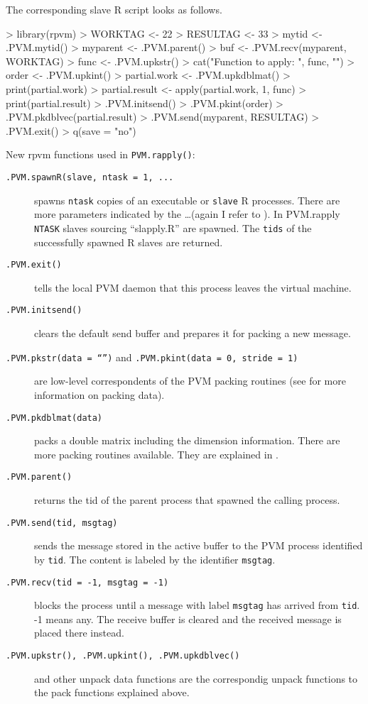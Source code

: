 The corresponding slave R script looks as follows.

\begin{Schunk}
\begin{Sinput}
> library(rpvm)
> WORKTAG <- 22
> RESULTAG <- 33
> mytid <- .PVM.mytid()
> myparent <- .PVM.parent()
> buf <- .PVM.recv(myparent, WORKTAG)
> func <- .PVM.upkstr()
> cat("Function to apply: ", func, "\n")
> order <- .PVM.upkint()
> partial.work <- .PVM.upkdblmat()
> print(partial.work)
> partial.result <- apply(partial.work, 1, func)
> print(partial.result)
> .PVM.initsend()
> .PVM.pkint(order)
> .PVM.pkdblvec(partial.result)
> .PVM.send(myparent, RESULTAG)
> .PVM.exit()
> q(save = "no")
\end{Sinput}
\end{Schunk}


New rpvm functions used in \texttt{PVM.rapply()}:

\begin{description}
\item[\texttt{.PVM.spawnR(slave, ntask = 1, ...}] spawns \texttt{ntask} copies
  of an executable or \texttt{slave} R processes. There are more
  parameters indicated by the \ldots (again I refer to \cite{nali07rpvm}). In
  PVM.rapply \texttt{NTASK} slaves sourcing ``slapply.R'' are
  spawned. The \texttt{tids} of the successfully spawned R slaves are
  returned.
\item[\texttt{.PVM.exit()}] tells the local PVM daemon that this process leaves
  the virtual machine.
\item[\texttt{.PVM.initsend()}] clears the default send buffer and
  prepares it for packing a new message.
\item[\texttt{.PVM.pkstr(data = ``'')} and \texttt{.PVM.pkint(data =
    0, stride = 1)}] are low-level correspondents of the PVM packing
    routines (see \cite{geist94pvm} for more information on packing
    data). 
\item[\texttt{.PVM.pkdblmat(data)}] packs a double matrix including
  the dimension information. There are more packing routines
  available. They are explained in \cite{nali07rpvm}.
\item[\texttt{.PVM.parent()}] returns the tid of the parent process
  that spawned the calling process.
\item[\texttt{.PVM.send(tid, msgtag)}] sends the message stored in the
  active buffer to the PVM process identified by \texttt{tid}. The
  content is labeled by the identifier \texttt{msgtag}.
\item[\texttt{.PVM.recv(tid = -1, msgtag = -1)}] blocks the process
  until a message with label \texttt{msgtag} has arrived from
  \texttt{tid}. -1 means any. The receive buffer is cleared
  and the received message is placed there instead.
\item[\texttt{.PVM.upkstr(), .PVM.upkint(), .PVM.upkdblvec()}] and other unpack data functions are
  the correspondig unpack functions to the pack functions explained above. 
\end{description}


